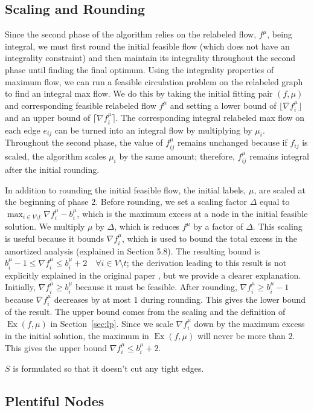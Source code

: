 \documentclass[12pt]{article}
\theoremstyle{definition}
\newcommand{\fu}{f^{\mu}}
\newcommand{\nfiu}{\nabla \fu_i}
\newcommand{\biu}{b_{i}^{\mu}}
\DeclareMathOperator{\Ex}{Ex}
\begin{document}
    \subsection{Scaling and Rounding} 
    Since the second phase of the algorithm relies on the relabeled flow, $f^\mu$, being integral, we must first round the initial feasible flow (which does not have an integrality constraint) and then maintain its integrality throughout the second phase until finding the final optimum. Using the integrality properties of maximum flow, we can run a feasible circulation problem on the relabeled graph to find an integral max flow. We do this by taking the initial fitting pair $(f, \mu)$ and corresponding feasible relabeled flow $f^\mu$ and setting a lower bound of $\lfloor \nabla f_i^\mu \rfloor$ and an upper bound of $\lceil \nabla f_i^\mu \rceil$. The corresponding integral relabeled max flow on each edge $e_{ij}$ can be turned into an integral flow by multiplying by $\mu_i$. Throughout the second phase, the value of $f_{ij}^\mu$ remains unchanged because if $f_{ij}$ is scaled, the algorithm scales $\mu_i$ by the same amount; therefore, $f_{ij}^\mu$ remains integral after the initial rounding.
    
    In addition to rounding the initial feasible flow, the initial labels, $\mu$, are scaled at the beginning of phase 2. Before rounding, we set a scaling factor $\Delta$ equal to $\max_{i \in V \setminus t} \nfiu - \biu$, which is the maximum excess at a node in the initial feasible solution. We multiply $\mu$ by $\Delta$, which is reduces $f^\mu$ by a factor of $\Delta$. This scaling is useful because it bounds $\nfiu$, which is used to bound the total excess in the amortized analysis (explained in Section 5.8). The resulting bound is $\biu - 1 \leq \nfiu \leq \biu + 2 \quad \forall i \in V \setminus t $; the derivation leading to this result is not explicitly explained in the original paper \cite{Olver2017}, but we provide a clearer explanation. Initially, $\nfiu \geq \biu$ because it must be feasible. After rounding, $\nfiu \geq \biu - 1$ because $\nfiu$ decreases by at most $1$ during rounding. This gives the lower bound of the result. The upper bound comes from the scaling and the definition of $\Ex(f, \mu)$ in Section~\ref{sec:lp}. Since we scale $\nfiu$ down by the maximum excess in the initial solution, the maximum in $\Ex(f,\mu)$ will never be more than $2$. This gives the upper bound $\nfiu \leq \biu + 2$. 

$S$ is formulated so that it doesn't cut any tight edges. 
\subsection{Plentiful Nodes}
\end{document}

